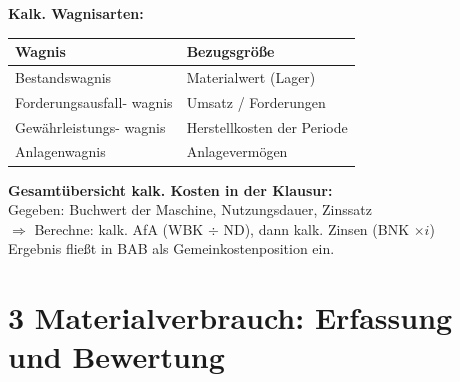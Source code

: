 \documentclass[10pt,a4paper]{article}
\begin{document}
\begin{multicols}{2}
\textbf{Kalk. Wagnisarten:}

\begin{tabular}{|L{2.5cm}|L{4.5cm}|}
\hline
{}
\textbf{Wagnis} & \textbf{Bezugsgröße} \\
\hline
Bestandswagnis & Materialwert (Lager) \\
Forderungsausfall- wagnis & Umsatz / Forderungen \\
Gewährleistungs- wagnis & Herstellkosten der Periode \\
Anlagenwagnis & Anlagevermögen \\
\hline
\end{tabular}

\vspace{4pt}
\begin{hinweisbox}
\textbf{Gesamtübersicht kalk. Kosten in der Klausur:}\\
Gegeben: Buchwert der Maschine, Nutzungsdauer, Zinssatz\\
$\Rightarrow$ Berechne: kalk. AfA (WBK $\div$ ND), dann kalk. Zinsen (BNK $\times i$)\\
Ergebnis fließt in BAB als Gemeinkostenposition ein.
\end{hinweisbox}

\end{multicols}

\newpage

\section{3 \quad Materialverbrauch: Erfassung und Bewertung}
\end{document}
